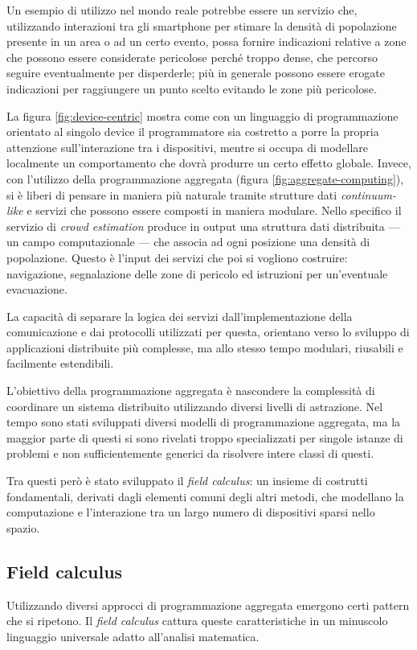 Un esempio di utilizzo nel mondo reale potrebbe essere un servizio che,
utilizzando interazioni tra gli smartphone per stimare la densità di popolazione
presente in un area o ad un certo evento, possa fornire indicazioni relative a
zone che possono essere considerate pericolose perché troppo dense, che percorso
seguire eventualmente per disperderle; più in generale possono essere erogate
indicazioni per raggiungere un punto scelto evitando le zone più pericolose.

La figura \ref{fig:device-centric} mostra come con un linguaggio di
programmazione orientato al singolo device il programmatore sia costretto a
porre la propria attenzione sull'interazione tra i dispositivi, mentre si occupa
di modellare localmente un comportamento che dovrà produrre un certo effetto
globale.  Invece, con l'utilizzo della programmazione aggregata (figura
\ref{fig:aggregate-computing}), si è liberi di pensare in maniera più naturale
tramite strutture dati \textit{continuum-like} e servizi che possono essere
composti in maniera modulare.  Nello specifico il servizio di \textit{crowd
  estimation} produce in output una struttura dati distribuita --- un campo
computazionale --- che associa ad ogni posizione una densità di
popolazione. Questo è l'input dei servizi che poi si vogliono costruire:
navigazione, segnalazione delle zone di pericolo ed istruzioni per un'eventuale
evacuazione.

La capacità di separare la logica dei servizi dall'implementazione della
comunicazione e dai protocolli utilizzati per questa, orientano verso lo
sviluppo di applicazioni distribuite più complesse, ma allo stesso tempo
modulari, riusabili e facilmente estendibili.

L'obiettivo della programmazione aggregata è nascondere la complessità di
coordinare un sistema distribuito utilizzando diversi livelli di astrazione.
Nel tempo sono stati sviluppati diversi modelli di programmazione aggregata, ma
la maggior parte di questi si sono rivelati troppo specializzati per singole
istanze di problemi e non sufficientemente generici da risolvere intere classi
di questi\cite{beal2012}.

Tra questi però è stato sviluppato il \textit{field calculus}: un insieme di
costrutti fondamentali, derivati dagli elementi comuni degli altri metodi, che
modellano la computazione e l'interazione tra un largo numero di dispositivi
sparsi nello spazio.

\subsection{Field calculus}
Utilizzando diversi approcci di programmazione aggregata emergono certi pattern
che si ripetono. Il \textit{field calculus} \cite{Viroli2013} cattura queste
caratteristiche in un minuscolo linguaggio universale adatto all'analisi
matematica.

